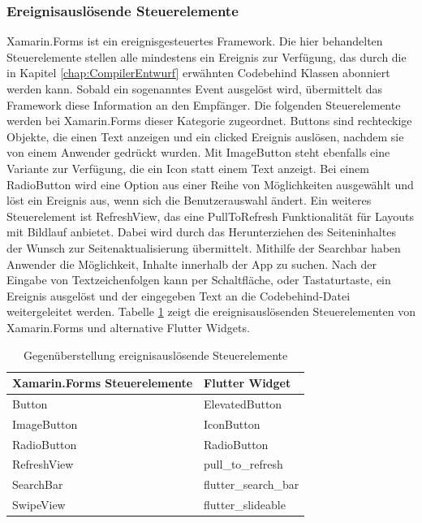 \subsubsection{Ereignisauslösende Steuerelemente}
Xamarin.Forms ist ein ereignisgesteuertes Framework. Die hier behandelten Steuerelemente stellen alle mindestens ein Ereignis zur Verfügung,  das durch die in Kapitel \ref{chap:CompilerEntwurf} erwähnten Codebehind Klassen abonniert werden kann.  Sobald ein  sogenanntes Event ausgelöst wird,  übermittelt das Framework diese Information an den Empfänger.   Die folgenden Steuerelemente werden bei Xamarin.Forms dieser Kategorie zugeordnet.  \glq Buttons\grq{} sind rechteckige Objekte,  die einen Text anzeigen und ein \glq clicked\grq{} Ereignis auslösen, nachdem sie von einem Anwender gedrückt wurden.  Mit \glq ImageButton\grq{} steht ebenfalls eine Variante zur Verfügung,  die ein Icon statt einem Text anzeigt.  Bei einem \glq RadioButton\grq{} wird eine Option aus einer Reihe von Möglichkeiten ausgewählt und löst ein Ereignis aus,  wenn sich die Benutzerauswahl ändert.  Ein weiteres Steuerelement ist \glq RefreshView\grq{}, das eine \glq PullToRefresh\grq{}  Funktionalität für Layouts mit Bildlauf anbietet.  Dabei wird durch das Herunterziehen des Seiteninhaltes der Wunsch zur Seitenaktualisierung  übermittelt.  Mithilfe der \glq Searchbar\grq{} haben Anwender die Möglichkeit, Inhalte  innerhalb der App zu suchen.  Nach der  Eingabe von Textzeichenfolgen kann per Schaltfläche,  oder Tastaturtaste, ein Ereignis ausgelöst und der eingegeben Text an die Codebehind-Datei weitergeleitet werden.  Tabelle \ref{tab:eventcommands} zeigt die ereignisauslösenden Steuerelementen von Xamarin.Forms und alternative Flutter Widgets.
\begin{table}[!ht]
\begin{tabularx}{\textwidth}{X|X}
   \textbf{Xamarin.Forms Steuerelemente} & \textbf{Flutter Widget}  \\
\hline
	Button		       				&  	ElevatedButton 		\\ 
	ImageButton		       		&  	IconButton 		\\ 
	RadioButton		       		&  	RadioButton 		\\ 
	RefreshView		       		&  	pull\_to\_refresh 		\\ 
	SearchBar		       			&  	flutter\_search\_bar 	\\ 
	SwipeView		       		&  	flutter\_slideable 		\\ 
\end{tabularx}
\caption{Gegenüberstellung ereignisauslösende Steuerelemente}
 \label{tab:eventcommands}
\end{table}

